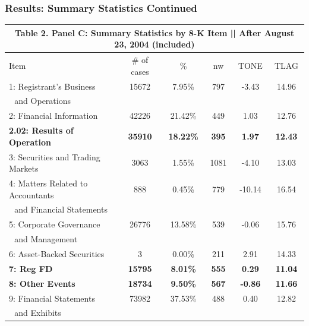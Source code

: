 \documentclass{beamer}
\begin{document}
\begin{frame}
\frametitle{Results: Summary Statistics Continued}

\begin{table}[H]   \label{T2PC}%
	\begin{center} \scriptsize
		\begin{tabular}{lccccc}
			\multicolumn{6}{c}{\textbf{Table 2. Panel C: Summary Statistics by 8-K Item || After August 23, 2004 (included)}} \\
			\midrule
			\midrule
			Item & \multicolumn{1}{c}{\# of cases} & \multicolumn{1}{c}{\% } & \multicolumn{1}{c}{nw} & \multicolumn{1}{c}{TONE} & \multicolumn{1}{c}{TLAG} \\
			\midrule
			1: Registrant's Business & 15672 & 7.95\% & 797 & -3.43 & 14.96 \\
			\: \,\, and Operations & &  &  &  & \\
			2: Financial Information & 42226 & 21.42\% & 449 & 1.03 & 12.76 \\
			\textbf{2.02: Results of Operation} & \textbf{35910} & \textbf{18.22\%} & \textbf{395} & \textbf{1.97} & \textbf{12.43} \\
			3: Securities and Trading Markets & 3063 & 1.55\% & 1081 & -4.10 & 13.03 \\
			4: Matters Related to Accountants & 888 & 0.45\% & 779 & -10.14 & 16.54 \\
			\: \,\, and Financial Statements & &  &  &  & \\
			5: Corporate Governance & 26776 & 13.58\% & 539 & -0.06 & 15.76 \\
			\: \,\, and Management & &  &  &  & \\
			6: Asset-Backed Securities & 3 & 0.00\% & 211 & 2.91 & 14.33 \\
			\textbf{7: Reg FD} & \textbf{15795} & \textbf{8.01\%} & \textbf{555} & \textbf{0.29} & \textbf{11.04} \\
			\textbf{8: Other Events} & \textbf{18734} & \textbf{9.50\%} & \textbf{567} & \textbf{-0.86} & \textbf{11.66} \\
			9: Financial Statements & 73982 & 37.53\% & 488 & 0.40 & 12.82 \\
			\: \,\, and Exhibits & &  &  &  & \\
			\bottomrule
			\bottomrule
		\end{tabular}%
	\end{center}
\end{table}%



\end{frame}
\end{document}
